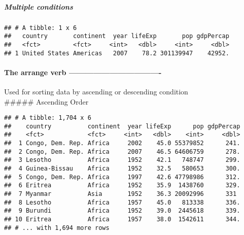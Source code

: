 \documentclass[]{article}
\newenvironment{Shaded}{\begin{snugshade}}{\end{snugshade}}
\newcommand{\KeywordTok}[1]{\textcolor[rgb]{0.13,0.29,0.53}{\textbf{#1}}}
\newcommand{\DecValTok}[1]{\textcolor[rgb]{0.00,0.00,0.81}{#1}}
\newcommand{\StringTok}[1]{\textcolor[rgb]{0.31,0.60,0.02}{#1}}
\newcommand{\OperatorTok}[1]{\textcolor[rgb]{0.81,0.36,0.00}{\textbf{#1}}}
\newcommand{\NormalTok}[1]{#1}
\let\oldparagraph\paragraph
\renewcommand{\paragraph}[1]{\oldparagraph{#1}\mbox{}}
\let\oldsubparagraph\subparagraph
\renewcommand{\subparagraph}[1]{\oldsubparagraph{#1}\mbox{}}
\begin{document}
\subparagraph{Multiple conditions}\label{multiple-conditions}

\begin{Shaded}
\end{Shaded}

\begin{verbatim}
## # A tibble: 1 x 6
##   country       continent  year lifeExp       pop gdpPercap
##   <fct>         <fct>     <int>   <dbl>     <int>     <dbl>
## 1 United States Americas   2007    78.2 301139947    42952.
\end{verbatim}

\paragraph{The arrange verb
----------------------------------}\label{the-arrange-verb--}

Used for sorting data by ascending or descending condition\\
\#\#\#\#\# Ascending Order

\begin{Shaded}
\end{Shaded}

\begin{verbatim}
## # A tibble: 1,704 x 6
##    country          continent  year lifeExp      pop gdpPercap
##    <fct>            <fct>     <int>   <dbl>    <int>     <dbl>
##  1 Congo, Dem. Rep. Africa     2002    45.0 55379852      241.
##  2 Congo, Dem. Rep. Africa     2007    46.5 64606759      278.
##  3 Lesotho          Africa     1952    42.1   748747      299.
##  4 Guinea-Bissau    Africa     1952    32.5   580653      300.
##  5 Congo, Dem. Rep. Africa     1997    42.6 47798986      312.
##  6 Eritrea          Africa     1952    35.9  1438760      329.
##  7 Myanmar          Asia       1952    36.3 20092996      331 
##  8 Lesotho          Africa     1957    45.0   813338      336.
##  9 Burundi          Africa     1952    39.0  2445618      339.
## 10 Eritrea          Africa     1957    38.0  1542611      344.
## # ... with 1,694 more rows
\end{verbatim}
\end{document}
